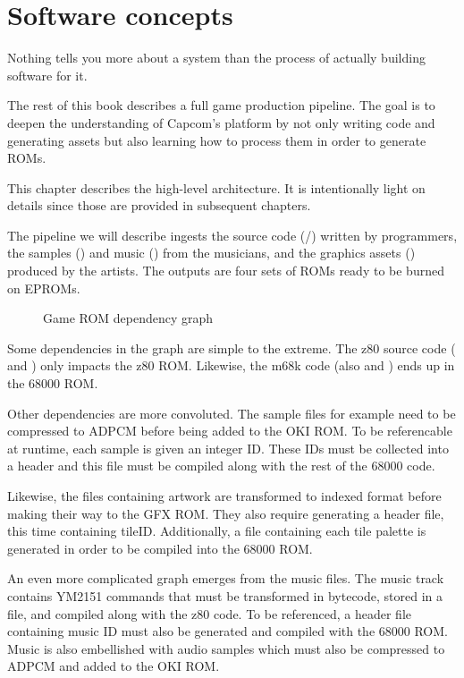\chapter{Software concepts}

Nothing tells you more about a system than the process of actually building software for it.

The rest of this book describes a full game production pipeline. The goal is to deepen the understanding of Capcom's platform by not only writing code and generating assets but also learning how to process them in order to generate ROMs.

This chapter describes the high-level architecture. It is intentionally light on details since those are provided in subsequent chapters.

The pipeline we will describe ingests the source code (/) written by programmers, the samples () and music () from the musicians, and the graphics assets () produced by the artists. The outputs are four sets of ROMs ready to be burned on EPROMs. 

 \begin{figure}[H]
\caption*{Game ROM dependency graph}
\end{figure}

\pagebreak
Some dependencies in the graph are simple to the extreme. The z80 source code ( and ) only impacts the z80 ROM. Likewise, the m68k code (also  and ) ends up in the 68000 ROM.

Other dependencies are more convoluted. The  sample files for example need to be compressed to ADPCM before being added to the OKI ROM. To be referencable at runtime, each sample is given an integer ID. These IDs must be collected into a  header and this file must be compiled along with the rest of the 68000 code.

Likewise, the  files containing artwork are transformed to indexed format before making their way to the GFX ROM. They also require generating a  header file, this time containing tileID. Additionally, a  file containing each tile palette is generated in order to be compiled into the 68000 ROM. 

An even more complicated graph emerges from the music  files. The music track contains YM2151 commands that must be transformed in bytecode, stored in a  file, and compiled along with the z80 code. To be referenced, a header file containing music ID must also be generated and compiled with the 68000 ROM. Music is also embellished with audio samples which must also be compressed to ADPCM and added to the OKI ROM.

